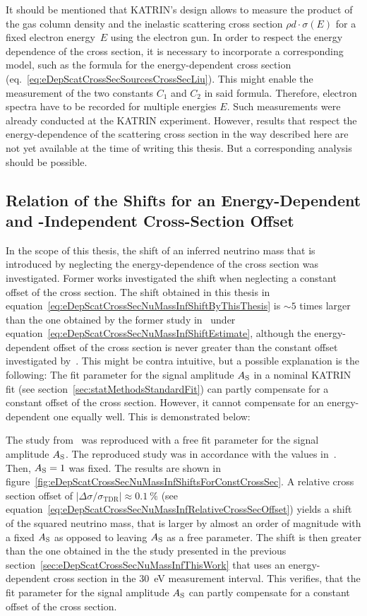 It should be mentioned that KATRIN's design allows to measure the product of the gas column density and the inelastic scattering cross section $\rho d \cdot \sigma(E)$ for a fixed electron energy~$E$ using the electron gun. In order to respect the energy dependence of the cross section, it is necessary to incorporate a corresponding model, such as the formula for the energy-dependent cross section (eq.~\ref{eq:eDepScatCrossSecSourcesCrossSecLiu}). This might enable the measurement of the two constants $C_1$ and $C_2$ in said formula. Therefore, electron spectra have to be recorded for multiple energies $E$. Such measurements were already conducted at the KATRIN experiment. However, results that respect the energy-dependence of the scattering cross section in the way described here are not yet available at the time of writing this thesis. But a corresponding analysis should be possible.

\subsection{Relation of the Shifts for an Energy-Dependent and -Independent Cross-Section Offset}
\label{sec:eDepScatCrossSecNuMassInfRelateGrohAndFormerWork}
In the scope of this thesis, the shift of an inferred neutrino mass that is introduced by neglecting the energy-dependence of the cross section was investigated. Former works investigated the shift when neglecting a constant offset of the cross section. The shift obtained in this thesis in equation~\eqref{eq:eDepScatCrossSecNuMassInfShiftByThisThesis} is $\sim5$ times larger than the one obtained by the former study in~\cite{Groh2015} under equation~\eqref{eq:eDepScatCrossSecNuMassInfShiftEstimate}, although the energy-dependent offset of the cross section is never greater than the constant offset investigated by~\cite{Groh2015}. This might be contra intuitive, but a possible explanation is the following: The fit parameter for the signal amplitude $A_{\mathrm{S}}$ in a nominal KATRIN fit (see section~\ref{sec:statMethodsStandardFit}) can partly compensate for a constant offset of the cross section. However, it cannot compensate for an energy-dependent one equally well. This is demonstrated below:

The study from~\cite{Groh2015} was reproduced with a free fit parameter for the signal amplitude $A_{\mathrm{S}}$. The reproduced study was in accordance with the values in~\cite{Groh2015}. Then, $A_{\mathrm{S}}=1$ was fixed. The results are shown in figure~\ref{fig:eDepScatCrossSecNuMassInfShiftsForConstCrossSec}. A relative cross section offset of $
\left|
	\Delta\sigma/\sigma_\mathrm{TDR}
\right| \approx \SI{0.1}{\percent}
$ (see equation~\ref{eq:eDepScatCrossSecNuMassInfRelativeCrossSecOffset}) yields a shift of the squared neutrino mass, that is larger by almost an order of magnitude with a fixed $A_{\mathrm{S}}$ as opposed to leaving $A_{\mathrm{S}}$ as a free parameter. The shift is then greater than the one obtained in the the study presented in the previous section~\ref{sec:eDepScatCrossSecNuMassInfThisWork} that uses an energy-dependent cross section in the \SI{30}{eV} measurement interval. This verifies, that the fit parameter for the signal amplitude $A_{\mathrm{S}}$ can partly compensate for a constant offset of the cross section. 

